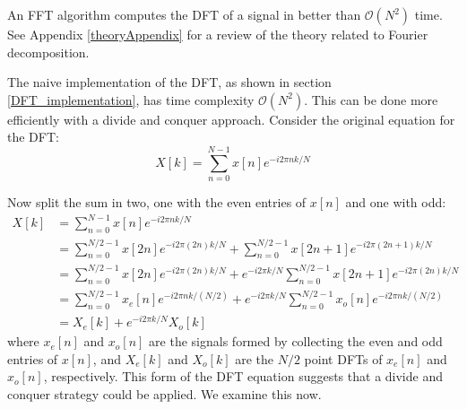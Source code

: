 An FFT algorithm computes the DFT of a signal in better than $\mathcal{O}(N^2)$ time. See Appendix \ref{theoryAppendix} for a review of the theory related to Fourier decomposition. 

The naive implementation of the DFT, as shown in section \ref{DFT_implementation}, has time complexity $\mathcal{O}(N^2)$. This can be done more efficiently with a divide and conquer approach. Consider the original equation for the DFT:
\[
X[k] = \sum_{n=0}^{N-1}x[n]e^{-i2\pi n k /N}
\]

Now split the sum in two, one with the even entries of $x[n]$ and one with odd:
\begin{align*}
X[k] &= \sum_{n=0}^{N-1}x[n]e^{-i2\pi n k /N}\\
&= \sum_{n=0}^{N/2-1}x[2n]e^{-i2\pi (2n) k /N} + \sum_{n=0}^{N/2-1}x[2n+1]e^{-i2\pi (2n+1) k /N}\\
&= \sum_{n=0}^{N/2-1}x[2n]e^{-i2\pi (2n) k /N} + e^{-i2\pi k/N}\sum_{n=0}^{N/2-1}x[2n+1]e^{-i2\pi (2n) k /N}\\
&= \sum_{n=0}^{N/2-1}x_e[n]e^{-i2\pi n k /(N/2)} + e^{-i2\pi k/N}\sum_{n=0}^{N/2-1}x_o[n]e^{-i2\pi n k /(N/2)}\\
&= X_e[k] + e^{-i2\pi k/N}X_o[k] \tag{*} \label{evenOdd} 
\end{align*}
where $x_e[n]$ and $x_o[n]$ are the signals formed by collecting the even and odd entries of $x[n]$, and $X_e[k]$ and $X_o[k]$ are the $N/2$ point DFTs of $x_e[n]$ and $x_o[n]$, respectively. This form of the DFT equation suggests that a divide and conquer strategy could be applied. We examine this now.

